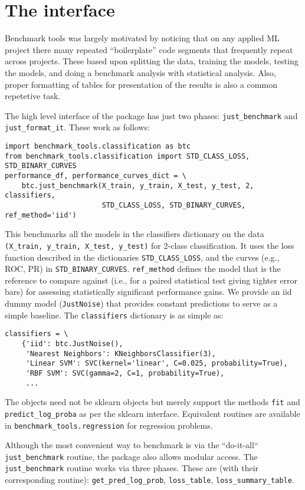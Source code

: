 \documentclass{article}
\newcommand{\code}{\texttt}
\begin{document}
\section{The interface}

Benchmark tools was largely motivated by noticing that on any applied ML project there many repeated ``boilerplate'' code segments that frequently repeat across projects.
These based upon splitting the data, training the models, testing the models, and doing a benchmark analysis with statistical analysis.
Also, proper formatting of tables for presentation of the results is also a common repetetive task.

The high level interface of the package has just two phases: \code{just\_benchmark} and \code{just\_format\_it}.
These work as follows:	
\begin{verbatim}
import benchmark_tools.classification as btc
from benchmark_tools.classification import STD_CLASS_LOSS, STD_BINARY_CURVES
performance_df, performance_curves_dict = \
    btc.just_benchmark(X_train, y_train, X_test, y_test, 2, classifiers,
                       STD_CLASS_LOSS, STD_BINARY_CURVES, ref_method='iid')
\end{verbatim}
This benchmarks all the models in the classifiers dictionary on the data \code{(X\_train, y\_train, X\_test, y\_test)} for 2-class classification.
It uses the loss function described in the dictionaries \code{STD\_CLASS\_LOSS}, and the curves (e.g., ROC, PR) in \code{STD\_BINARY\_CURVES}.
\code{ref\_method} defines the model that is the reference to compare against (i.e., for a paired statistical test giving tighter error bars) for assessing statistically significant performance gains.
We provide an iid dummy model (\code{JustNoise}) that provides constant predictions to serve as a simple baseline.
The \code{classifiers} dictionary is as simple as:
\begin{verbatim}
classifiers = \
    {'iid': btc.JustNoise(),
     'Nearest Neighbors': KNeighborsClassifier(3),
     'Linear SVM': SVC(kernel='linear', C=0.025, probability=True),
     'RBF SVM': SVC(gamma=2, C=1, probability=True),
     ...
\end{verbatim}
The objects need not be sklearn objects but merely support the methods \code{fit} and \code{predict\_log\_proba} as per the sklearn interface.
Equivalent routines are available in \code{benchmark\_tools.regression} for regression problems.

Although the most convenient way to benchmark is via the ``do-it-all`` \code{just\_benchmark} routine, the package also allows modular access.
The \code{just\_benchmark} routine works via three phases.
These are (with their corresponding routine): \code{get\_pred\_log\_prob}, \code{loss\_table}, \code{loss\_summary\_table}.
\end{document}
